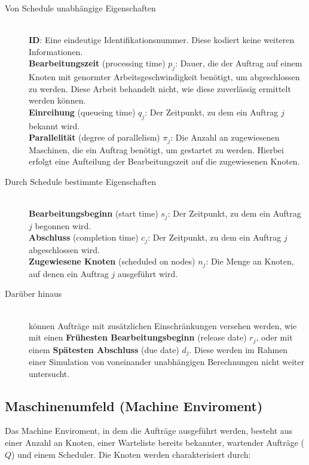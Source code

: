 \begin{description}
\item[Von Schedule unabhängige Eigenschaften] \hfil \\
\textbf{ID}: Eine eindeutige Identifikationsnummer. Diese kodiert keine weiteren Informationen.\\
\textbf{Bearbeitungszeit} (processing time) $p_j$: Dauer, die der Auftrag auf einem Knoten mit genormter Arbeitsgeschwindigkeit benötigt, um abgeschlossen zu werden. Diese Arbeit behandelt nicht, wie diese zuverlässig ermittelt werden können. \\
\textbf{Einreihung} (queueing time) $q_j$: Der Zeitpunkt, zu dem ein Auftrag $j$ bekannt wird.\\
\textbf{Parallelität} (degree of parallelism) $\pi_j$: Die Anzahl an zugewiesenen Maschinen, die ein Auftrag benötigt, um gestartet zu werden. Hierbei erfolgt eine Aufteilung der Bearbeitungszeit auf die zugewiesenen Knoten.\\
\item[Durch Schedule bestimmte Eigenschaften]\hfill \\ 
\textbf{Bearbeitungsbeginn} (start time) $s_j$: Der Zeitpunkt, zu dem ein Auftrag $j$ begonnen wird. \\
\textbf{Abschluss} (completion time) $c_j$: Der Zeitpunkt, zu dem ein Auftrag $j$ abgeschlossen wird.\\
\textbf{Zugewiesene Knoten} (scheduled on nodes) $n_j$: Die Menge an Knoten, auf denen ein Auftrag $j$ ausgeführt wird.\\

\item[Darüber hinaus] \hfil \\
können Aufträge mit zusätzlichen Einschränkungen versehen werden, wie mit einen \textbf{Frühesten Bearbeitungsbeginn} (release date) $r_j$, oder mit einem \textbf{Spätesten Abschluss} (due date) $d_j$. Diese werden im Rahmen einer Simulation von voneinander unabhängigen Berechnungen nicht weiter untersucht.
\end{description}

\subsection{Maschinenumfeld (Machine Enviroment)}
Das Machine Enviroment, in dem die Aufträge ausgeführt werden, besteht aus einer Anzahl an Knoten, einer Warteliste bereits bekannter, wartender Aufträge ($Q$) und einem Scheduler. Die Knoten werden charakterisiert durch:

